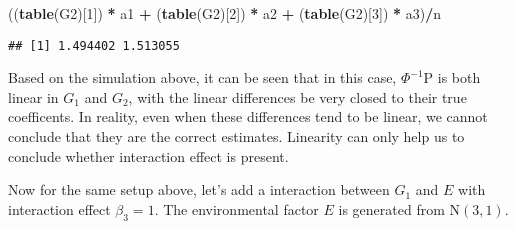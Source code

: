 \documentclass[]{article}
\newenvironment{Shaded}{\begin{snugshade}}{\end{snugshade}}
\newcommand{\DataTypeTok}[1]{\textcolor[rgb]{0.13,0.29,0.53}{#1}}
\newcommand{\DecValTok}[1]{\textcolor[rgb]{0.00,0.00,0.81}{#1}}
\newcommand{\KeywordTok}[1]{\textcolor[rgb]{0.13,0.29,0.53}{\textbf{#1}}}
\newcommand{\NormalTok}[1]{#1}
\newcommand{\OperatorTok}[1]{\textcolor[rgb]{0.81,0.36,0.00}{\textbf{#1}}}
\newcommand{\StringTok}[1]{\textcolor[rgb]{0.31,0.60,0.02}{#1}}
\begin{document}
\begin{Shaded}
\begin{Highlighting}[]
\NormalTok{((}\KeywordTok{table}\NormalTok{(G2)[}\DecValTok{1}\NormalTok{]) }\OperatorTok{*}\StringTok{ }\NormalTok{a1 }\OperatorTok{+}\StringTok{ }\NormalTok{(}\KeywordTok{table}\NormalTok{(G2)[}\DecValTok{2}\NormalTok{]) }\OperatorTok{*}\StringTok{ }\NormalTok{a2 }\OperatorTok{+}\StringTok{ }\NormalTok{(}\KeywordTok{table}\NormalTok{(G2)[}\DecValTok{3}\NormalTok{]) }\OperatorTok{*}\StringTok{ }\NormalTok{a3)}\OperatorTok{/}\NormalTok{n}
\end{Highlighting}
\end{Shaded}

\begin{verbatim}
## [1] 1.494402 1.513055
\end{verbatim}

Based on the simulation above, it can be seen that in this case,
\(\Phi^{-1}\text{P}\) is both linear in \(G_1\) and \(G_2\), with the
linear differences be very closed to their true coefficents. In reality,
even when these differences tend to be linear, we cannot conclude that
they are the correct estimates. Linearity can only help us to conclude
whether interaction effect is present.

Now for the same setup above, let's add a interaction between \(G_1\)
and \(E\) with interaction effect \(\beta_3 = 1\). The environmental
factor \(E\) is generated from \(\text{N}(3,1)\).

\begin{Shaded}
\end{Shaded}
\end{document}
